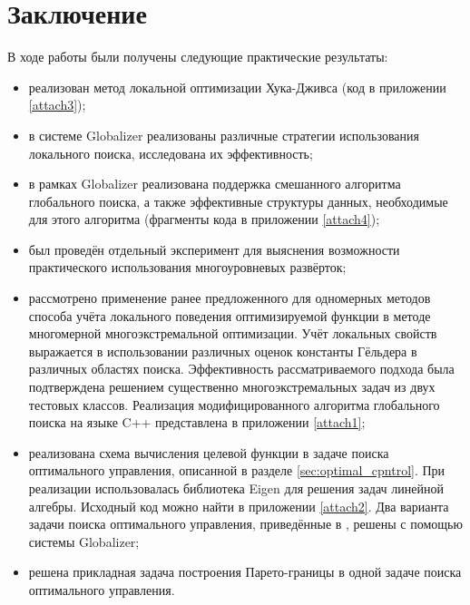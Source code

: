 \section{Заключение}
В ходе работы были получены следующие практические результаты:
\begin{itemize}
  \item реализован метод локальной оптимизации Хука-Дживса (код в приложении \ref{attach3});
  \item в системе Globalizer реализованы различные стратегии использования локального поиска,
  исследована их эффективность;
  \item в рамках Globalizer реализована поддержка смешанного алгоритма глобального поиска,
  а также эффективные структуры данных, необходимые для этого алгоритма (фрагменты кода в приложении \ref{attach4});
  \item был проведён отдельный эксперимент для выяснения возможности практического использования многоуровневых развёрток;
  \item рассмотрено применение ранее предложенного для одномерных методов способа учёта
  локального поведения оптимизируемой функции в методе многомерной многоэкстремальной
  оптимизации. Учёт локальных свойств выражается в использовании различных оценок
  константы Гёльдера в различных областях поиска. Эффективность рассматриваемого подхода
  была подтверждена решением существенно многоэкстремальных задач из двух тестовых классов.
  Реализация модифицированного алгоритма глобального поиска на языке C++ представлена
  в приложении \ref{attach1};
  \item реализована схема вычисления целевой функции в задаче поиска оптимального управления,
  описанной в разделе \ref{sec:optimal_cpntrol}.
  При реализации использовалась библиотека Eigen \cite{eigenLib} для решения задач
  линейной алгебры. Исходный код можно найти в приложении \ref{attach2}.
  Два варианта задачи поиска оптимального управления,
  приведённые в \cite{optControl}, решены с помощью системы Globalizer;
  \item решена прикладная задача построения Парето-границы в одной задаче поиска оптимального
  управления.
\end{itemize}
